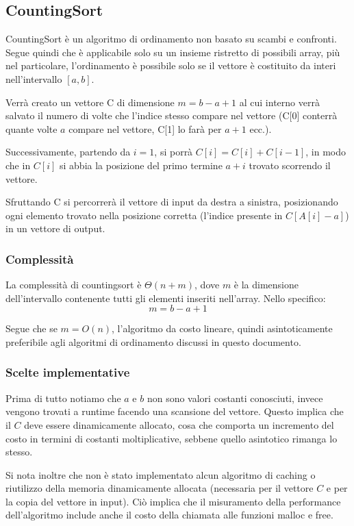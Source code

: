 \documentclass{article}
\begin{document}
    \subsection{CountingSort}   
        CountingSort è un algoritmo di ordinamento non basato su scambi e confronti. Segue quindi che è applicabile solo su un insieme ristretto di possibili array, più nel particolare, l'ordinamento è possibile solo se il vettore è costituito da interi nell'intervallo $[a, b]$.
        
        Verrà creato un vettore C di dimensione $m=b-a+1$ al cui interno verrà salvato il numero di volte che l'indice stesso compare nel vettore (C[0] conterrà quante volte $a$ compare nel vettore, C[1] lo farà per $a+1$ ecc.).
        
        Successivamente, partendo da $i=1$, si porrà $C[i]=C[i]+C[i-1]$, in modo che in $C[i]$ si abbia la posizione del primo termine $a+i$ trovato scorrendo il vettore.
        
        Sfruttando C si percorrerà il vettore di input da destra a sinistra, posizionando ogni elemento trovato nella posizione corretta (l'indice presente in $C[A[i]-a]$) in un vettore di output.

        \subsubsection{Complessità}        
            La complessità di countingsort è $\Theta(n + m)$, dove $m$ è la dimensione dell'intervallo contenente tutti gli elementi inseriti nell'array. Nello specifico: $$m = b - a + 1$$

            Segue che se $m = O(n)$, l'algoritmo da costo lineare, quindi asintoticamente preferibile agli algoritmi di ordinamento discussi in questo documento.

        \subsubsection{Scelte implementative}
            Prima di tutto notiamo che $a$ e $b$ non sono valori costanti conosciuti, invece vengono trovati a runtime facendo una scansione del vettore. Questo implica che il $C$ deve essere dinamicamente allocato, cosa che comporta un incremento del costo in termini di costanti moltiplicative, sebbene quello asintotico rimanga lo stesso.

            Si nota inoltre che non è stato implementato alcun algoritmo di caching o  riutilizzo della memoria dinamicamente allocata (necessaria per il vettore $C$ e per la copia del vettore in input). Ciò implica che il misuramento della performance dell'algoritmo include anche il costo della chiamata alle funzioni malloc e free.
\end{document}
